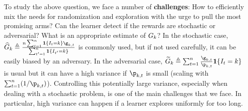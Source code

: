 
To study the above question, we face a number of \textbf{challenges}: 
How to efficiently mix the needs for randomization and exploration with
the urge to pull the most promising arms? 
Can the learner detect
if the rewards are stochastic or adversarial? What is an appropriate estimate 
of $G_{k}$? %
In the stochastic case,
$\estBiasCumulGain_{k} \triangleq
\frac{\timeHorizon\sum_{t=1}^{\timeHorizon}
	\indicator{\pulledArm_{t}=k}\gainVector_{k,t}}{\sum_{t'=1}^{\timeHorizon}\indicator{\pulledArm_{t'}=k}}
$ %
is commonly used, but if not used carefully, it can be easily biased 
by an adversary. In the adversarial case,
$\estCumulGainVector_{k} \triangleq \sum_{t=1}^{\timeHorizon}
\frac{\gainVector_{k,t}}
{\learnerDist_{k,t}} \indicator{\pulledArm_{t} = k} $ is usual but it can have a 
high variance if $\learnerDist_{k,t}$ is small (scaling with
$\sum_{t=1}^{\timeHorizon} (1/ \learnerDist_{k,t})$).  Controlling this
potentially large variance, especially when dealing with a stochastic
problem, is one of the main challenges that we face. In particular,
high variance can happen %
if
a learner explores uniformly for too long.

